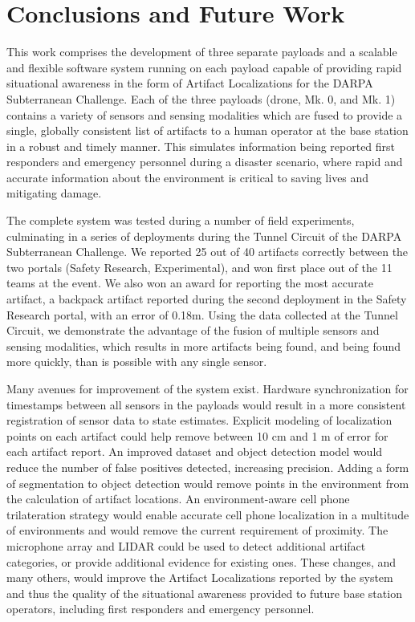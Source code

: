 \chapter{Conclusions and Future Work}

This work comprises the development of three separate payloads and a scalable and flexible software system running on each payload capable of providing rapid situational awareness in the form of Artifact Localizations for the DARPA Subterranean Challenge. Each of the three payloads (drone, Mk. 0, and Mk. 1) contains a variety of sensors and sensing modalities which are fused to provide a single, globally consistent list of artifacts to a human operator at the base station in a robust and timely manner. This simulates information being reported first responders and emergency personnel during a disaster scenario, where rapid and accurate information about the environment is critical to saving lives and mitigating damage.

The complete system was tested during a number of field experiments, culminating in a series of deployments during the Tunnel Circuit of the DARPA Subterranean Challenge. We reported 25 out of 40 artifacts correctly between the two portals (Safety Research, Experimental), and won first place out of the 11 teams at the event. We also won an award for reporting the most accurate artifact, a backpack artifact reported during the second deployment in the Safety Research portal, with an error of 0.18m. Using the data collected at the Tunnel Circuit, we demonstrate the advantage of the fusion of multiple sensors and sensing modalities, which results in more artifacts being found, and being found more quickly, than is possible with any single sensor.

Many avenues for improvement of the system exist. Hardware synchronization for timestamps between all sensors in the payloads would result in a more consistent registration of sensor data to state estimates. Explicit modeling of localization points on each artifact could help remove between 10 cm and 1 m of error for each artifact report. An improved dataset and object detection model would reduce the number of false positives detected, increasing precision. Adding a form of segmentation to object detection would remove points in the environment from the calculation of artifact locations. An environment-aware cell phone trilateration strategy would enable accurate cell phone localization in a multitude of environments and would remove the current requirement of proximity. The microphone array and LIDAR could be used to detect additional artifact categories, or provide additional evidence for existing ones. These changes, and many others, would improve the Artifact Localizations reported by the system and thus the quality of the situational awareness provided to future base station operators, including first responders and emergency personnel.